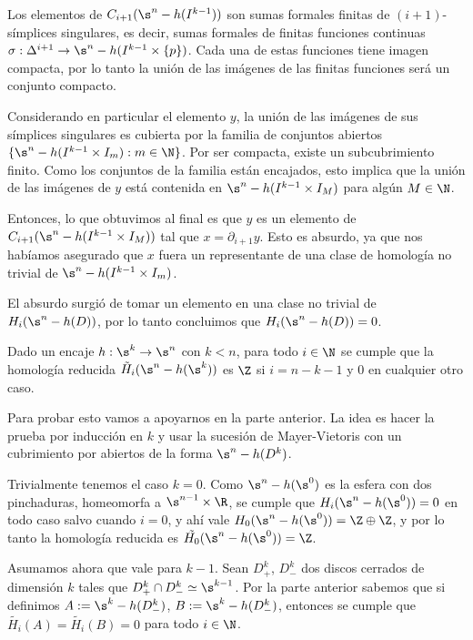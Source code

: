 \begin{dem}
    Los elementos de $C_{i+1}(\s^n - h(I^{k-1}))$ son sumas formales finitas de $(i+1)$-símplices singulares, es decir, sumas formales de finitas funciones continuas $\sigma:\Delta^{i+1}\to\s^n - h(I^{k-1}\times\{p\})$. Cada una de estas funciones tiene imagen compacta, por lo tanto la unión de las imágenes de las finitas funciones será un conjunto compacto.

    Considerando en particular el elemento $y$, la unión de las imágenes de sus símplices singulares es cubierta por la familia de conjuntos abiertos $\{\s^n - h(I^{k-1}\times I_m) : m\in\N\}$. Por ser compacta, existe un subcubrimiento finito. Como los conjuntos de la familia están encajados, esto implica que la unión de las imágenes de $y$ está contenida en $\s^n - h(I^{k-1}\times I_M)$ para algún $M\in\N$.
    
    Entonces, lo que obtuvimos al final es que $y$ es un elemento de $C_{i+1}(\s^n - h(I^{k-1}\times I_M))$ tal que $x=\partial_{i+1} y$. Esto es absurdo, ya que nos habíamos asegurado que $x$ fuera un representante de una clase de homología no trivial de $\s^n - h(I^{k-1}\times I_m)$.

    El absurdo surgió de tomar un elemento en una clase no trivial de $H_i(\s^n-h(D))$, por lo tanto concluimos que $H_i(\s^n-h(D))=0$.

    \begin{teo}
    Dado un encaje $h:\s^k\to \s^n$ con $k<n$, para todo $i\in\N$ se cumple que la homología reducida $\tilde{H}_i(\s^n - h(\s^k))$ es $\Z$ si $i=n-k-1$ y $0$ en cualquier otro caso.
    \end{teo}

    \begin{dem}

    Para probar esto vamos a apoyarnos en la parte anterior. La idea es hacer la prueba por inducción en $k$ y usar la sucesión de Mayer-Vietoris con un cubrimiento por abiertos de la forma $\s^n - h(D^k)$. 

    Trivialmente tenemos el caso $k=0$. Como $\s^n - h(\s^0)$ es la esfera con dos pinchaduras, homeomorfa a $\s^{n-1}\times\R$, se cumple que $H_i(\s^n - h(\s^0))=0$ en todo caso salvo cuando $i=0$, y ahí vale $H_0(\s^n - h(\s^0))=\Z\oplus\Z$, y por lo tanto la homología reducida es $\tilde{H_0}(\s^n - h(\s^0))=\Z$.

    Asumamos ahora que vale para $k-1$. Sean $D^k_+$, $D^k_-$ dos discos cerrados de dimensión $k$ tales que $D^k_+\cap D^k_- \simeq\s^{k-1}$. Por la parte anterior sabemos que si definimos $A:=\s^k-h(D^k_-)$, $B:=\s^k-h(D^k_-)$, entonces se cumple que $\tilde{H_i}(A)=\tilde{H_i}(B)=0$ para todo $i\in\N$. 
    

\end{dem}
\end{dem}
